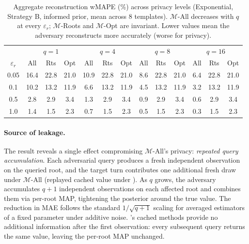 \begin{table}[t]
\centering
\setlength{\tabcolsep}{2.5pt}
\small
\caption{Aggregate reconstruction wMAPE (\%) across privacy levels (Exponential, Strategy B, informed prior, mean across 8 templates). $\mathcal{M}$-All decreases with $q$ at every $\varepsilon_r$; $\mathcal{M}$-Roots and $\mathcal{M}$-Opt are invariant. Lower values mean the adversary reconstructs more accurately (worse for privacy).}
\label{tab:recon_main}
\begin{tabular}{c|ccc|ccc|ccc|ccc}
\toprule
& \multicolumn{3}{c|}{$q=1$} & \multicolumn{3}{c|}{$q=4$} & \multicolumn{3}{c|}{$q=8$} & \multicolumn{3}{c}{$q=16$} \\
$\varepsilon_r$ & All & Rts & Opt & All & Rts & Opt & All & Rts & Opt & All & Rts & Opt \\
\midrule
0.05 & 16.4 & 22.8 & 21.0 & 10.9 & 22.8 & 21.0 & 8.6  & 22.8 & 21.0 & 6.4 & 22.8 & 21.0 \\
0.1  & 10.2 & 13.2 & 11.9 & 6.6  & 13.2 & 11.9 & 4.5  & 13.2 & 11.9 & 3.2 & 13.2 & 11.9 \\
0.5  & 2.8  & 2.9  & 3.4  & 1.3  & 2.9  & 3.4  & 0.9  & 2.9  & 3.4  & 0.6 & 2.9  & 3.4 \\
1.0  & 1.4  & 1.5  & 2.3  & 0.7  & 1.5  & 2.3  & 0.5  & 1.5  & 2.3  & 0.3 & 1.5  & 2.3 \\
\bottomrule
\end{tabular}
\end{table}

\paragraph{Source of leakage.}
The result reveals a single effect compromising $\mathcal{M}$-All's privacy: \emph{repeated query accumulation}. Each adversarial query produces a fresh independent observation on the queried root, and the target turn contributes one additional fresh draw under $\mathcal{M}$-All (replayed cached value under \sysname{}). As $q$ grows, the adversary accumulates $q+1$ independent observations on each affected root and combines them via per-root MAP, tightening the posterior around the true value. The reduction in MAE follows the standard $1/\sqrt{q+1}$ scaling for averaged estimators of a fixed parameter under additive noise. \sysname{}'s cached methods provide no additional information after the first observation: every subsequent query returns the same value, leaving the per-root MAP unchanged.


